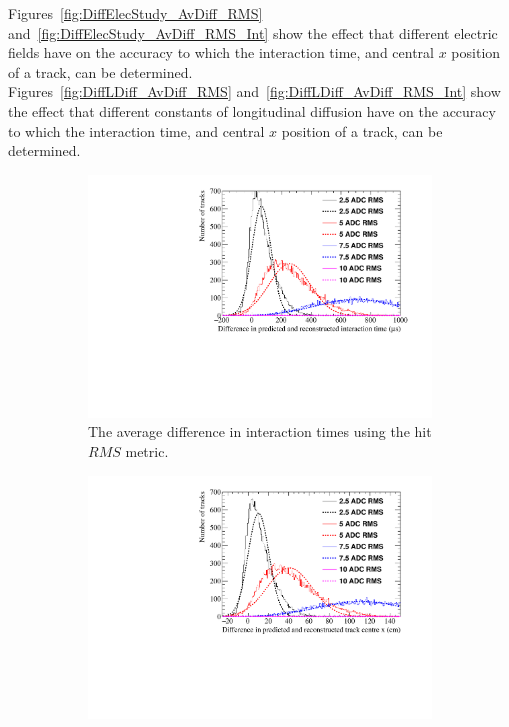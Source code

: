 Figures~\ref{fig:DiffElecStudy_AvDiff_RMS} and~\ref{fig:DiffElecStudy_AvDiff_RMS_Int} show the effect that different electric fields have on the accuracy to which the interaction time, and central $x$ position of a track, can be determined. \\

Figures~\ref{fig:DiffLDiff_AvDiff_RMS} and~\ref{fig:DiffLDiff_AvDiff_RMS_Int} show the effect that different constants of longitudinal diffusion have on the accuracy to which the interaction time, and central $x$ position of a track, can be determined. \\

\begin{figure}
  \centering
  \begin{subfigure}{0.6\textwidth}
    \centering
    \includegraphics[width=\textwidth]{Canvas_AvDiff_T_RMS_NoiseLevel}
    \caption{The average difference in interaction times using the hit $RMS$ metric.}
    \label{fig:DiffNoiseStudy_AvDiffRMS_T}
  \end{subfigure}
  \begin{subfigure}{0.6\textwidth}
    \centering
    \includegraphics[width=\textwidth]{Canvas_AvDiff_X_RMS_NoiseLevel}

\end{subfigure}
\end{figure}
